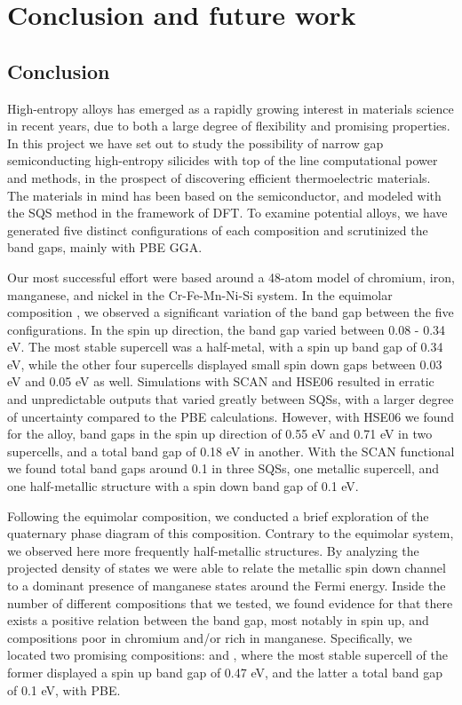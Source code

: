 \documentclass[UKenglish]{ifimaster}  %
\begin{document}
\part{Conclusion and future work}
\chapter{Conclusion}

High-entropy alloys has emerged as a rapidly growing interest in materials science in recent years, due to both a large degree of flexibility and promising properties. In this project we have set out to study the possibility of narrow gap semiconducting high-entropy silicides with top of the line computational power and methods, in the prospect of discovering efficient thermoelectric materials. The materials in mind has been based on the  semiconductor, and modeled with the SQS method in the framework of DFT. To examine potential alloys, we have generated five distinct configurations of each composition and scrutinized the band gaps, mainly with PBE GGA.  

Our most successful effort were based around a 48-atom model of chromium, iron, manganese, and nickel in the Cr-Fe-Mn-Ni-Si system. In the equimolar composition , we observed a significant variation of the band gap between the five configurations. In the spin up direction, the band gap varied between 0.08 - 0.34 eV. The most stable supercell was a half-metal, with a spin up band gap of 0.34 eV, while the other four supercells displayed small spin down gaps between 0.03 eV and 0.05 eV as well. Simulations with SCAN and HSE06 resulted in erratic and unpredictable outputs that varied greatly between SQSs, with a larger degree of uncertainty compared to the PBE calculations. However, with HSE06 we found for the  alloy, band gaps in the spin up direction of 0.55 eV and 0.71 eV in two supercells, and a total band gap of 0.18 eV in another. With the SCAN functional we found total band gaps around 0.1 in three SQSs, one metallic supercell, and one half-metallic structure with a spin down band gap of 0.1 eV.   

Following the equimolar composition, we conducted a brief exploration of the quaternary phase diagram of this composition. Contrary to the equimolar system, we observed here more frequently half-metallic structures. By analyzing the projected density of states we were able to relate the metallic spin down channel to a dominant presence of manganese states around the Fermi energy.  Inside the number of different compositions that we tested, we found evidence for that there exists a positive relation between the band gap, most notably in spin up, and compositions poor in chromium and/or rich in manganese. Specifically, we located two promising compositions:  and , where the most stable supercell of the former displayed a spin up band gap of 0.47 eV, and the latter a total band gap of 0.1 eV, with PBE.
\end{document}
